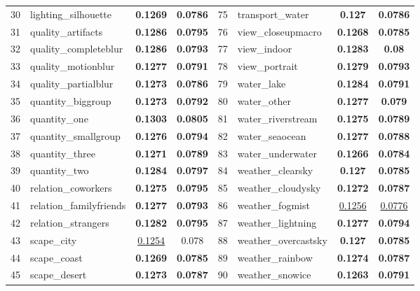 \begin{table}[ht!]
\begin{scriptsize}
\begin{tabular}{|c|lcc||c|lcc|}
30&lighting\_silhouette&\textbf{0.1269}&\textbf{0.0786}&        75&transport\_water&   	\textbf{0.127}&    	\textbf{0.0786}\\         
31&quality\_artifacts&	\textbf{0.1286}&\textbf{0.0795}&        76&view\_closeupmacro&  \textbf{ 0.1268}&    	\textbf{ 0.0785}\\         
32&quality\_completeblur&\textbf{0.1286}&\textbf{0.0793}&       77&view\_indoor&   	\textbf{0.1283}&    	\textbf{0.08}\\         
33&quality\_motionblur&	\textbf{0.1277}&\textbf{0.0791}&      	78&view\_portrait&   	\textbf{0.1279}&    	\textbf{0.0793}\\         
34&quality\_partialblur&\textbf{0.1273}&\textbf{0.0786}&        79&water\_lake&   	\textbf{0.1284}&    	\textbf{0.0791}\\         
35&quantity\_biggroup&	\textbf{0.1273}&\textbf{0.0792}&        80&water\_other&   	\textbf{0.1277}&    	\textbf{0.079}\\         
36&quantity\_one&	\textbf{0.1303}&\textbf{0.0805}&        81&water\_riverstream&  \textbf{0.1275}&    	\textbf{0.0789}\\         
37&quantity\_smallgroup&\textbf{0.1276}&\textbf{0.0794}&        82&water\_seaocean&   	\textbf{0.1277}&    	\textbf{0.0788}\\         
38&quantity\_three&	\textbf{0.1271}&\textbf{0.0789}&        83&water\_underwater&   \textbf{0.1266}&    	\textbf{0.0784}\\         
39&quantity\_two&	\textbf{0.1284}&\textbf{0.0797}&        84&weather\_clearsky&   \textbf{0.127}&    	\textbf{0.0785}\\         
40&relation\_coworkers&	\textbf{0.1275}&\textbf{0.0795}&        85&weather\_cloudysky&  \textbf{0.1272}&    	\textbf{0.0787}\\         
41&relation\_familyfriends&\textbf{0.1277}&\textbf{0.0793}&     86&weather\_fogmist&   	\underline{0.1256}&   \underline{0.0776}\\         
42&relation\_strangers&	\textbf{0.1282}&\textbf{0.0795}&        87&weather\_lightning&  \textbf{0.1277}&    	\textbf{0.0794}\\         
43&scape\_city&		\underline{0.1254}&0.078&            	88&weather\_overcastsky&\textbf{0.127}&    	\textbf{0.0785}\\
44&scape\_coast&	\textbf{0.1269}&\textbf{0.0785}&        89&weather\_rainbow&   	\textbf{0.1274}&    	\textbf{0.0787}\\         
45&scape\_desert&	\textbf{0.1273}&\textbf{0.0787}&        90&weather\_snowice&   	\textbf{0.1263}&    	\textbf{0.0791}\\         
\hline                 
\end{tabular}
\end{scriptsize}
\end{table}

